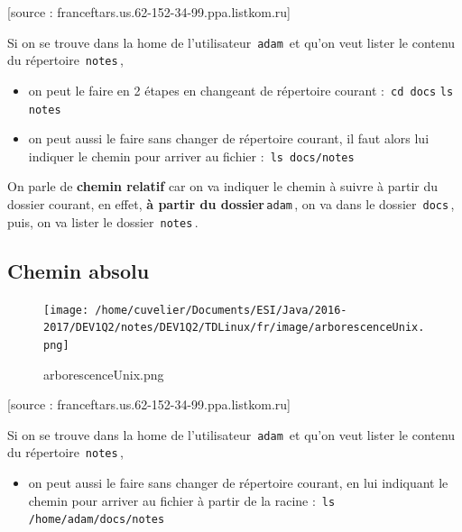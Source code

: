 \documentclass[11pt,a4paper]{article}
\begin{document}
			    
			    [source : franceftars.us.62-152-34-99.ppa.listkom.ru]
        
            \par
        
        Si on se trouve dans la home de l'utilisateur \,\verb|adam|\, et qu'on veut lister le contenu du r\'epertoire \,\verb|notes|\,,
        
					\begin{itemize}
				
			\item 
            on peut le faire en 2 \'etapes en changeant de r\'epertoire courant :
            \,\verb|cd docs|\,\,\verb|ls notes|\,
			\item 
            on peut aussi le faire sans changer de r\'epertoire courant, 
            il faut alors lui indiquer le chemin pour arriver au fichier :
            \,\verb|ls docs/notes|\,
					\end{itemize}
				
        On parle de  \textbf{chemin relatif} car on va indiquer le chemin \`a suivre \`a partir du dossier courant,
        en effet, \textbf{\`a partir du dossier}\,\verb|adam|\,,
        on va dans le dossier \,\verb|docs|\,, puis, on va lister le dossier \,\verb|notes|\,.
        
            \par
        \subsection{Chemin absolu}\begin{figure}[hbt]
				    \begin{center}
					\texttt{[image: /home/cuvelier/Documents/ESI/Java/2016-2017/DEV1Q2/notes/DEV1Q2/TDLinux/fr/image/arborescenceUnix.png]}
						\end{center}
                
                    \caption[arborescenceUnix.png]{arborescenceUnix.png}
                \end{figure}
                    
			    
			    [source : franceftars.us.62-152-34-99.ppa.listkom.ru]
        
            \par
        
        Si on se trouve dans la home de l'utilisateur \,\verb|adam|\, et qu'on veut lister le contenu du r\'epertoire \,\verb|notes|\,,
        
					\begin{itemize}
				
			\item 
            on peut aussi le faire sans changer de r\'epertoire courant, 
            en lui indiquant le chemin pour arriver au fichier \`a partir de la racine :
            \,\verb|ls /home/adam/docs/notes|\,
					\end{itemize}
				
\end{document}

